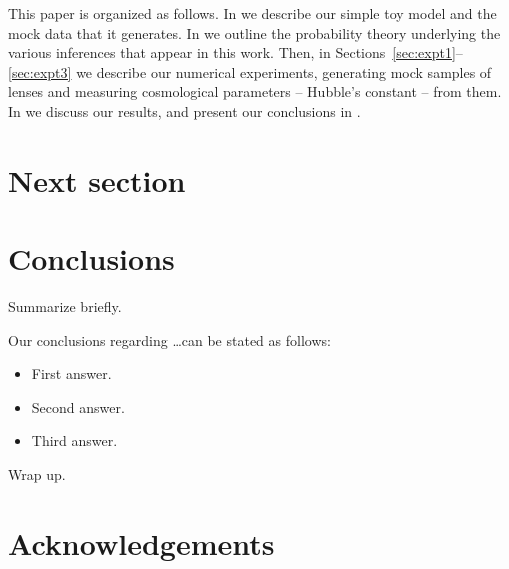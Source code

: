 \documentclass[useAMS,usenatbib]{mn2e}
\begin{document}
This paper is organized as follows. In  we describe our simple toy model and the mock data that it generates. In  we outline the probability theory underlying the various inferences that appear in this work. Then, in Sections~\ref{sec:expt1}--\ref{sec:expt3} we describe our numerical experiments, generating mock samples of lenses and measuring cosmological parameters -- Hubble's constant -- from them. In  we discuss our results, and present our conclusions in .



\section{Next section}
\label{sec:next}



\section{Conclusions}
\label{sec:conclude}

Summarize briefly.

Our conclusions regarding \ldots can be stated as follows:

\begin{itemize}

\item First answer.

\item Second answer.

\item Third answer.

\end{itemize}

Wrap up.



\section*{Acknowledgements}






\label{lastpage}
\bsp
\end{document}
